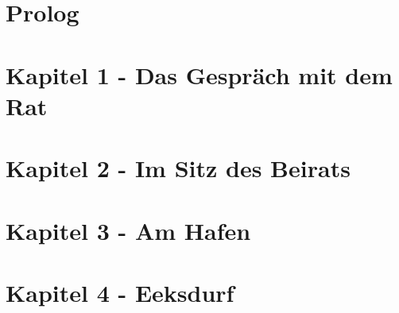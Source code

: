 
\section{Prolog}


\section{Kapitel 1 - Das Gespräch mit dem Rat}



\section{Kapitel 2 - Im Sitz des Beirats}



\section{Kapitel 3 - Am Hafen}
\label{Hafen}


\section{Kapitel 4 - Eeksdurf}
\label{xd}

